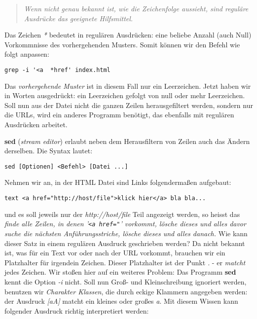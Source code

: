 \documentclass[titlepage,a4paper]{article}
\begin{document}
\begin{quote}
\emph{Wenn nicht genau bekannt ist, wie die Zeichenfolge aussieht, sind
  reguläre Ausdrücke das geeignete Hilfsmittel.}
\end{quote}

Das Zeichen \emph{*} bedeutet in regulären Ausdrücken:  eine beliebe Anzahl
(auch Null) Vorkommnisse des vorhergehenden Musters.  Somit können wir den
Befehl wie folgt anpassen:

\begin{verbatim}
grep -i '<a  *href' index.html
\end{verbatim}

Das \emph{vorhergehende Muster} ist in diesem Fall nur ein Leerzeichen.  Jetzt
haben wir in Worten ausgedrückt: ein Leerzeichen gefolgt von null oder mehr
Leerzeichen.  Soll nun aus der Datei nicht die ganzen Zeilen herausgefiltert
werden, sondern nur die URLs, wird ein anderes Programm benötigt, das
ebenfalls mit regulären Ausdrücken arbeitet.

\textbf{sed} (\emph{stream editor}) erlaubt neben dem Herausfiltern von Zeilen
auch das Ändern derselben.  Die Syntax lautet:

\begin{verbatim}
sed [Optionen] <Befehl> [Datei ...]
\end{verbatim}

Nehmen wir an, in der HTML Datei sind Links folgendermaßen aufgebaut:

\begin{verbatim}
text <a href="http://host/file">klick hier</a> bla bla...
\end{verbatim}

und es soll jeweils nur der \emph{http://host/file} Teil angezeigt werden, so
heisst das \emph{finde alle Zeilen, in denen '\texttt{<a href="}' vorkommt, lösche
  dieses und alles davor suche die nächsten An\-führ\-ungs\-striche, lösche dieses
  und alles danach.}  Wie kann dieser Satz in einem regulären Ausdruck
geschrieben werden?  Da nicht bekannt ist, was für ein Text vor oder nach der
URL vorkommt, brauchen wir ein Platzhalter für irgendein Zeichen.  Dieser
Platzhalter ist der Punkt \emph{.} - er \emph{matcht} jedes Zeichen.  Wir
stoßen hier auf ein weiteres Problem:  Das Programm \textbf{sed} kennt die
Option \emph{-i} nicht.  Soll nun Groß- und Kleinschreibung ignoriert werden,
benutzen wir \emph{Charakter Klassen}, die durch eckige Klammern angegeben
werden: der Ausdruck \emph{[aA]} matcht ein kleines oder großes \emph{a}.
Mit diesem Wissen kann folgender Ausdruck richtig interpretiert werden:
\end{document}
